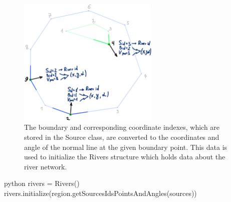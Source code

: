 \documentclass[]{pracamgr}
\begin{document}
      \begin{figure}[H]
        \centering
        \includegraphics[width=0.6\textwidth]{figs/rivers_initialization.jpg}        
        \caption{The boundary and corresponding coordinate indexes, which are stored in the Source class, are converted to the coordinates and angle of the normal line at the given boundary point. This data is used to initialize the Rivers structure which holds data about the river network.}
        \label{rivers_initialization}
      \end{figure}

      \begin{mintedbox}{python}
        rivers = Rivers()
        rivers.initialize(region.getSourcesIdsPointsAndAngles(sources))\end{mintedbox}
      
\end{document}
